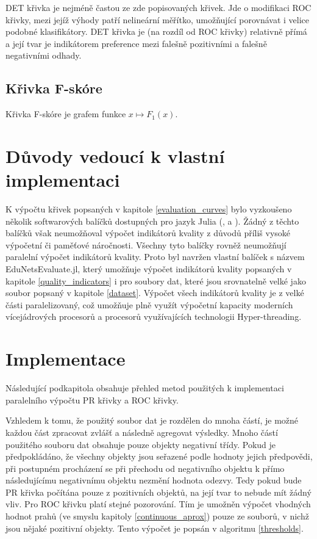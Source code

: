 DET křivka je nejméně častou ze zde popisovaných křivek. Jde o modifikaci ROC křivky, mezi jejíž výhody patří nelineární měřítko, umožňující porovnávat i velice podobné klasifikátory. DET křivka je (na rozdíl od ROC křivky) relativně přímá a její tvar je indikátorem preference mezi falešně pozitivními a falešně negativními odhady.

\subsection{Křivka F-skóre}
Křivka F-skóre je grafem funkce \( x \mapsto F_1 \left( x \right) \).

\section{Důvody vedoucí k vlastní implementaci}
K výpočtu křivek popsaných v kapitole \ref{evaluation_curves} bylo vyzkoušeno několik softwarových balíčků dostupných pro jazyk Julia (\cite{zea_roc.jl:_2015}, \cite{leeuwen_rocanalysis.jl:_2016} a \cite{lin_mlbase.jl:_2017}). Žádný z těchto balíčků však neumožňoval výpočet indikátorů kvality z důvodů příliš vysoké výpočetní či paměťové náročnosti. Všechny tyto balíčky rovněž neumožňují paralelní výpočet indikátorů kvality. Proto byl navržen vlastní balíček s názvem EduNetsEvaluate.jl, který umožňuje výpočet indikátorů kvality popsaných v kapitole \ref{quality_indicators} i pro soubory dat, které jsou srovnatelně velké jako soubor popsaný v kapitole \ref{dataset}. Výpočet všech indikátorů kvality je z velké části paralelizovaný, což umožňuje plně využít výpočetní kapacity moderních vícejádrových procesorů a procesorů využívajících technologii Hyper-threading.

\section{Implementace}
Následující podkapitola obsahuje přehled metod použitých k implementaci paralelního výpočtu PR křivky a ROC křivky.

Vzhledem k tomu, že použitý soubor dat je rozdělen do mnoha částí, je možné každou část zpracovat zvlášť a následně agregovat výsledky. Mnoho částí použitého souboru dat obsahuje pouze objekty negativní třídy. Pokud je předpokládáno, že všechny objekty jsou seřazené podle hodnoty jejich předpovědi, při postupném procházení se při přechodu od negativního objektu k přímo následujícímu negativnímu objektu nezmění hodnota odezvy. Tedy pokud bude PR křivka počítána pouze z pozitivních objektů, na její tvar to nebude mít žádný vliv. Pro ROC křivku platí stejné pozorování. Tím je umožněn výpočet vhodných hodnot prahů (ve smyslu kapitoly \ref{continuous_aprox}) pouze ze souborů, v nichž jsou nějaké pozitivní objekty. Tento výpočet je popsán v algoritmu \ref{thresholds}.

